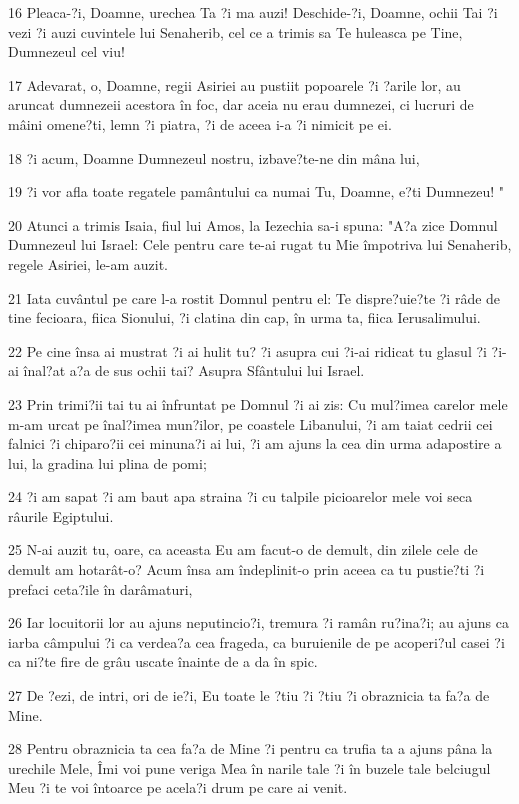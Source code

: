 \par 16 Pleaca-?i, Doamne, urechea Ta ?i ma auzi! Deschide-?i, Doamne, ochii Tai ?i vezi ?i auzi cuvintele lui Senaherib, cel ce a trimis sa Te huleasca pe Tine, Dumnezeul cel viu!
\par 17 Adevarat, o, Doamne, regii Asiriei au pustiit popoarele ?i ?arile lor, au aruncat dumnezeii acestora în foc, dar aceia nu erau dumnezei, ci lucruri de mâini omene?ti, lemn ?i piatra, ?i de aceea i-a ?i nimicit pe ei.
\par 18 ?i acum, Doamne Dumnezeul nostru, izbave?te-ne din mâna lui,
\par 19 ?i vor afla toate regatele pamântului ca numai Tu, Doamne, e?ti Dumnezeu! "
\par 20 Atunci a trimis Isaia, fiul lui Amos, la Iezechia sa-i spuna: "A?a zice Domnul Dumnezeul lui Israel: Cele pentru care te-ai rugat tu Mie împotriva lui Senaherib, regele Asiriei, le-am auzit.
\par 21 Iata cuvântul pe care l-a rostit Domnul pentru el: Te dispre?uie?te ?i râde de tine fecioara, fiica Sionului, ?i clatina din cap, în urma ta, fiica Ierusalimului.
\par 22 Pe cine însa ai mustrat ?i ai hulit tu? ?i asupra cui ?i-ai ridicat tu glasul ?i ?i-ai înal?at a?a de sus ochii tai? Asupra Sfântului lui Israel.
\par 23 Prin trimi?ii tai tu ai înfruntat pe Domnul ?i ai zis: Cu mul?imea carelor mele m-am urcat pe înal?imea mun?ilor, pe coastele Libanului, ?i am taiat cedrii cei falnici ?i chiparo?ii cei minuna?i ai lui, ?i am ajuns la cea din urma adapostire a lui, la gradina lui plina de pomi;
\par 24 ?i am sapat ?i am baut apa straina ?i cu talpile picioarelor mele voi seca râurile Egiptului.
\par 25 N-ai auzit tu, oare, ca aceasta Eu am facut-o de demult, din zilele cele de demult am hotarât-o? Acum însa am îndeplinit-o prin aceea ca tu pustie?ti ?i prefaci ceta?ile în darâmaturi,
\par 26 Iar locuitorii lor au ajuns neputincio?i, tremura ?i ramân ru?ina?i; au ajuns ca iarba câmpului ?i ca verdea?a cea frageda, ca buruienile de pe acoperi?ul casei ?i ca ni?te fire de grâu uscate înainte de a da în spic.
\par 27 De ?ezi, de intri, ori de ie?i, Eu toate le ?tiu ?i ?tiu ?i obraznicia ta fa?a de Mine.
\par 28 Pentru obraznicia ta cea fa?a de Mine ?i pentru ca trufia ta a ajuns pâna la urechile Mele, Îmi voi pune veriga Mea în narile tale ?i în buzele tale belciugul Meu ?i te voi întoarce pe acela?i drum pe care ai venit.
